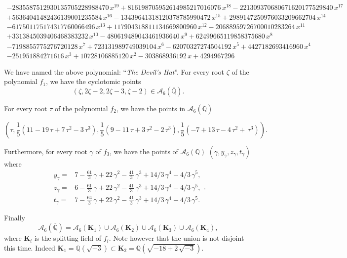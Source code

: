 \documentclass[a4paper,twoside]{article}
\begin{document}
\begin{tiny}
$$\begin{array}{l}
-2835587512930135705228988470\,{x}^{19}+816198705952614985217016076\,{x}^{18}-221309370680671620177529840\,{x}^{17}\\
+56364041482436139001235584\,{x}^{16}-13439641318120378785990472\,{x}^{15}+2989147250976033209662704\,{x}^{14}\\
-617501175174317760066496\,{x}^{13}+117904318811134669800960\,{x}^{12}-20688959726700010283264\,{x}^{11}\\
+3313845039406468383232\,{x}^{10}-480619489043461936640\,{x}^{9}+62499665119858375680\,{x}^{8}\\
-7198855775276720128\,{x}^{7}+723131989749039104\,{x}^{6}-62070327274504192\,{x}^{5}+4427182693416960\,{x}^{4}\\
-251951884271616\,{x}^{3}+10728106885120\,{x}^{2}-303868936192\,x+4294967296
\end{array}
$$
\end{tiny}
We have named the above polynomial: ``\textit{The Devil's Hat}''.
For every root $\zeta$ of the polynomial $f_1$, we have the
cyclotomic points $$(\zeta,2\zeta-2,2\zeta-3,\zeta-2)\in\mathcal
A_6(\overline{\mathbb Q}).$$

For every root $\tau$ of the polynomial $f_2$, we have the points
in $\mathcal A_6(\overline{\mathbb Q})$
\begin{small}
$$\left(\tau,
\frac{1}{5}({11}- {19}\,\tau+{7}\,{\tau}^{2}-{3}\,{\tau}^{3}),
\frac{1}{5}({9}-{11}\,\tau+{3}\,{\tau}^{2}-{2}\,{\tau}^{3}),
\frac{1}{5}(-{7}+{13}\,\tau-{4}\,{\tau}^{2}+\,{\tau}^{3})\right).$$
\end{small}
Furthermore, for every root $\gamma$ of $f_3$,   we have the points of
$\mathcal A_6(\mathbb Q)$
$(\gamma,y_\gamma,z_\gamma,t_\gamma)$ where
$$\begin{array}{rl}
y_\gamma=&7-{\frac {61}{3}}\,\gamma+22\,{\gamma}^{2}-{\frac {41}{3}}\,{\gamma}^{
3}+14/3\,{\gamma}^{4}-4/3\,{\gamma}^{5},\\
z_\gamma=&6-{\frac {61}{3}}\,\gamma+22\,{\gamma}^{2}-{\frac {41}{3}}\,{\gamma}^{
3}+14/3\,{\gamma}^{4}-4/3\,{\gamma}^{5},\\
t_\gamma=&7-{\frac {64}{3}}\,\gamma+22\,{\gamma}^{2}-{\frac {41}{3}}\,{\gamma}^{
3}+14/3\,{\gamma}^{4}-4/3\,{\gamma}^{5}.\end{array}.$$

Finally
$$\mathcal A_6(\overline{\mathbb Q})=
\mathcal A_6({\mathbf K}_1)\cup\mathcal A_6({\mathbf
K}_2)\cup\mathcal A_6({\mathbf K}_3)\cup\mathcal A_6({\mathbf
K}_4),$$ where $\mathbf K_i$ is the splitting field of $f_i$. Note
however that the union is not disjoint this time. Indeed $\mathbf
K_1=\mathbb Q(\sqrt{-3})\subset\mathbf K_2=\mathbb Q(\sqrt
{-18+2\,\sqrt {-3}})$.
\end{document}
